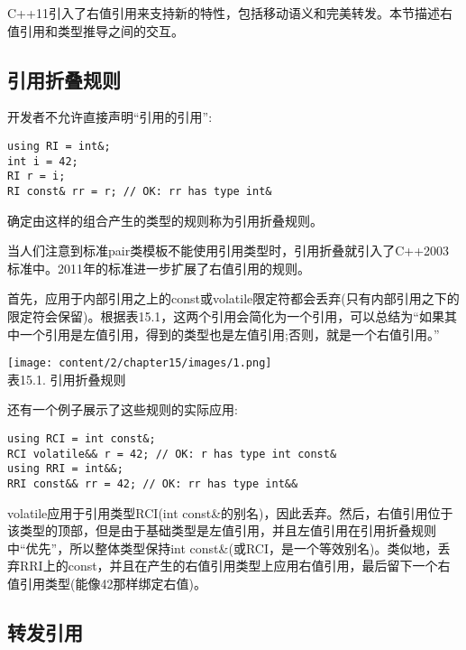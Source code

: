 
C++11引入了右值引用来支持新的特性，包括移动语义和完美转发。本节描述右值引用和类型推导之间的交互。

\subsection{引用折叠规则}

开发者不允许直接声明“引用的引用”:

\begin{lstlisting}[style=styleCXX]
using RI = int&;
int i = 42;
RI r = i;
RI const& rr = r; // OK: rr has type int&
\end{lstlisting}

确定由这样的组合产生的类型的规则称为引用折叠规则。

\begin{tcolorbox}[colback=webgreen!5!white,colframe=webgreen!75!black]
\hspace*{0.75cm}当人们注意到标准pair类模板不能使用引用类型时，引用折叠就引入了C++2003标准中。2011年的标准进一步扩展了右值引用的规则。
\end{tcolorbox}

首先，应用于内部引用之上的const或volatile限定符都会丢弃(只有内部引用之下的限定符会保留)。根据表15.1，这两个引用会简化为一个引用，可以总结为“如果其中一个引用是左值引用，得到的类型也是左值引用;否则，就是一个右值引用。”

\begin{center}
\texttt{[image: content/2/chapter15/images/1.png]} \\
表15.1. 引用折叠规则
\end{center}

还有一个例子展示了这些规则的实际应用:

\begin{lstlisting}[style=styleCXX]
using RCI = int const&;
RCI volatile&& r = 42; // OK: r has type int const&
using RRI = int&&;
RRI const&& rr = 42; // OK: rr has type int&&
\end{lstlisting}

volatile应用于引用类型RCI(int const\&的别名)，因此丢弃。然后，右值引用位于该类型的顶部，但是由于基础类型是左值引用，并且左值引用在引用折叠规则中“优先”，所以整体类型保持int const\&(或RCI，是一个等效别名)。类似地，丢弃RRI上的const，并且在产生的右值引用类型上应用右值引用，最后留下一个右值引用类型(能像42那样绑定右值)。

\subsection{转发引用}

